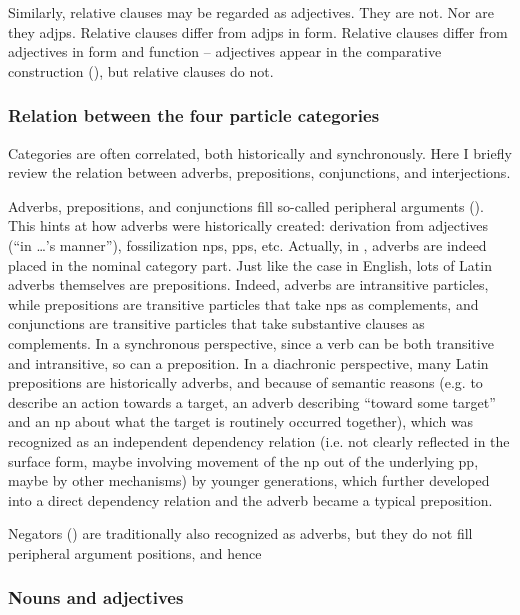 \documentclass{article}
\begin{document}
Similarly, relative clauses may be regarded as adjectives.
They are not. Nor are they \ac{adjp}s.
Relative clauses differ from \ac{adjp}s in form.
Relative clauses differ from adjectives in form and function 
-- adjectives appear in the comparative construction (),
but relative clauses do not.

\subsubsection{Relation between the four particle categories}\label{sec:particle-relation}

Categories are often correlated, both historically and synchronously.
Here I briefly review the relation between adverbs, prepositions, conjunctions, and interjections. %

Adverbs, prepositions, and conjunctions fill so-called peripheral arguments ().
This hints at how adverbs were historically created:
derivation from adjectives (``in \dots's manner''), 
fossilization \ac{np}s, \ac{pp}s, etc.
Actually, in \citet{forker2020grammar}, adverbs are indeed placed in the nominal category part.
Just like the case in English, 
lots of Latin adverbs themselves are prepositions.
Indeed, adverbs are intransitive particles,
while prepositions are transitive particles that take \ac{np}s as complements,
and conjunctions are transitive particles that take substantive clauses as complements.
In a synchronous perspective, since a verb can be both transitive and intransitive,
so can a preposition.
In a diachronic perspective, many Latin prepositions are historically adverbs, 
and because of semantic reasons (e.g. to describe an action towards a target,
an adverb describing ``toward some target'' and an \ac{np} about what the target is routinely occurred together),
which was recognized as an independent dependency relation 
(i.e. not clearly reflected in the surface form,
maybe involving movement of the \ac{np} out of the underlying \ac{pp},
maybe by other mechanisms) 
by younger generations,
which further developed into a direct dependency relation
and the adverb became a typical preposition.

Negators () are traditionally also recognized as adverbs, 
but they do not fill peripheral argument positions,
and hence %


\subsubsection{Nouns and adjectives}
\end{document}
